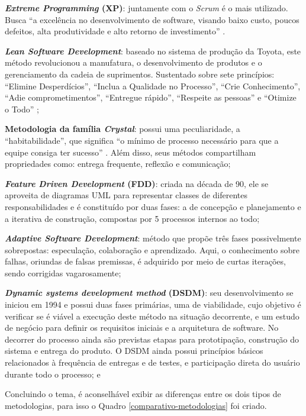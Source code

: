 \textbf{\textit{Extreme Programming} (XP)}: juntamente com o \textit{Scrum} é o mais utilizado. Busca ``a excelência no desenvolvimento de software, visando baixo custo, poucos defeitos, alta produtividade e alto retorno de investimento'' \cite{sato2007uso}.


\textbf{\textit{Lean Software Development}}: baseado no sistema de produção da Toyota, este método revolucionou a manufatura, o desenvolvimento de produtos e o gerenciamento da cadeia de suprimentos. Sustentado sobre sete princípios: ``Elimine Desperdícios'', ``Inclua a Qualidade no Processo'', ``Crie Conhecimento'', ``Adie comprometimentos'', ``Entregue rápido'', ``Respeite as pessoas'' e ``Otimize o Todo'' \cite{sato2007uso};
 
 
\textbf{Metodologia da família \textit{Crystal}}: possui uma peculiaridade, a ``habitabilidade'', que significa ``o mínimo de processo necessário para que a equipe consiga ter sucesso'' \cite{sato2007uso}. Além disso, seus métodos compartilham propriedades como: entrega frequente, reflexão e comunicação;


\textbf{\textit{Feature Driven Development} (FDD)}: criada na década de 90, ele se aproveita de diagramas UML para representar classes de diferentes responsabilidades e é constituído por duas fases: a de concepção e planejamento e a iterativa de construção, compostas por 5 processos internos ao todo;


\textbf{\textit{Adaptive Software Development}}: método que propõe três fases possivelmente sobrepostas: especulação, colaboração e aprendizado. Aqui, o conhecimento sobre falhas, oriundas de falsas premissas, é adquirido por meio de curtas iterações, sendo corrigidas vagarosamente;


\textbf{\textit{Dynamic systems development method} (DSDM)}: seu desenvolvimento se iniciou em 1994 e possui duas fases primárias, uma de viabilidade, cujo objetivo é verificar se é viável a execução deste método na situação decorrente, e um estudo de negócio para definir os requisitos iniciais e a arquitetura de software. No decorrer do processo ainda são previstas etapas para prototipação, construção do sistema e entrega do produto. O DSDM ainda possui princípios básicos relacionados à frequência de entregas e de testes, e participação direta do usuário durante todo o processo; e


Concluindo o tema, é aconselhável exibir as diferenças entre os dois tipos de metodologias, para isso o Quadro \ref{comparativo-metodologias} foi criado.

